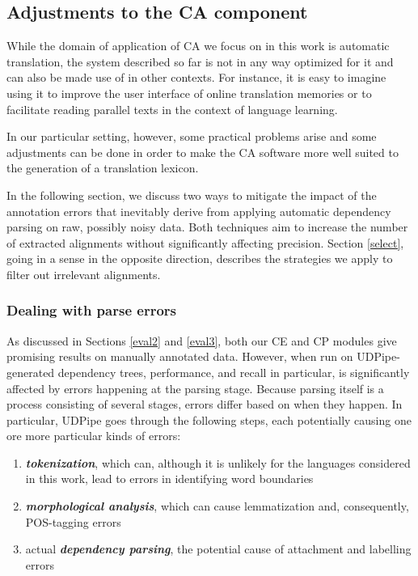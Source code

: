 \subsection{Adjustments to the CA component} \label{tuning}

While the domain of application of CA we focus on in this work is automatic translation, the system described so far is not in any way optimized for it and can also be made use of in other contexts. 
For instance, it is easy to imagine using it to improve the user interface of online translation memories or to facilitate reading parallel texts in the context of language learning. \smallskip

In our particular setting, however, some practical problems arise and some adjustments can be done in order to make the CA software more well suited to the generation of a translation lexicon. \smallskip

In the following section, we discuss two ways to mitigate the impact of the annotation errors that inevitably derive from applying automatic dependency parsing on raw, possibly noisy data. Both techniques aim to increase the number of extracted alignments without significantly affecting precision.
Section \ref{select}, going in a sense in the opposite direction, describes the strategies we apply to filter out irrelevant alignments.

\subsubsection{Dealing with parse errors}
As discussed in Sections \ref{eval2} and \ref{eval3}, both our CE and CP modules give promising results on manually annotated data. However, when run on UDPipe-generated dependency trees, performance, and recall in particular, is significantly affected by errors happening at the parsing stage. Because parsing itself is a process consisting of several stages, errors differ based on when they happen. In particular, UDPipe goes through the following steps, each potentially causing one ore more particular kinds of errors: \smallskip

\begin{enumerate} 
    \item \textit{\textbf{tokenization}}, which can, although it is unlikely for the languages considered in this work, lead to errors in identifying word boundaries
    \item \textit{\textbf{morphological analysis}}, which can cause lemmatization and, consequently, POS-tagging errors
    \item actual \textit{\textbf{dependency parsing}}, the potential cause of attachment and labelling errors
\end{enumerate} \smallskip

